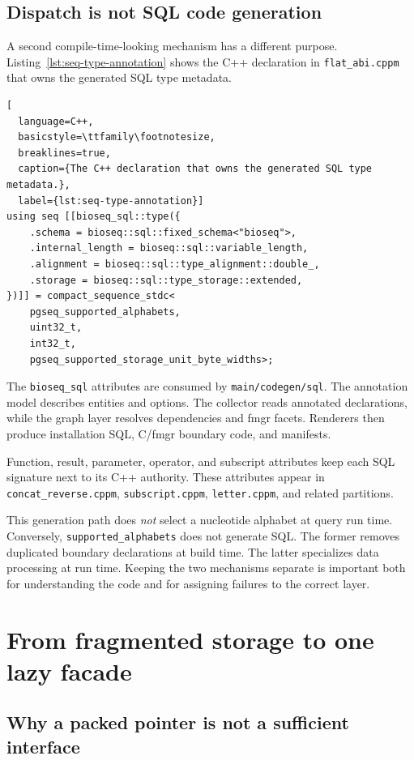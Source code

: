 \subsection{Dispatch is not SQL code generation}

A second compile-time-looking mechanism has a different purpose.
Listing~\ref{lst:seq-type-annotation} shows the C++ declaration in
\texttt{flat\_abi.cppm} that owns the generated SQL type metadata.

\begin{lstlisting}[
  language=C++,
  basicstyle=\ttfamily\footnotesize,
  breaklines=true,
  caption={The C++ declaration that owns the generated SQL type metadata.},
  label={lst:seq-type-annotation}]
using seq [[bioseq_sql::type({
    .schema = bioseq::sql::fixed_schema<"bioseq">,
    .internal_length = bioseq::sql::variable_length,
    .alignment = bioseq::sql::type_alignment::double_,
    .storage = bioseq::sql::type_storage::extended,
})]] = compact_sequence_stdc<
    pgseq_supported_alphabets,
    uint32_t,
    int32_t,
    pgseq_supported_storage_unit_byte_widths>;
\end{lstlisting}

The \texttt{bioseq\_sql} attributes are consumed by
\texttt{main/codegen/sql}.  The annotation model describes entities and
options.  The collector reads annotated declarations, while the graph layer
resolves dependencies and fmgr facets.  Renderers then produce installation
SQL, C/fmgr boundary code, and manifests.

Function, result, parameter, operator, and subscript attributes keep each SQL
signature next to its C++ authority.  These attributes appear in
\texttt{concat\_reverse.cppm}, \texttt{subscript.cppm},
\texttt{letter.cppm}, and related partitions.

This generation path does \emph{not} select a nucleotide alphabet at query
run time.  Conversely, \texttt{supported\_alphabets} does not generate SQL.
The former removes duplicated boundary declarations at build time.  The latter
specializes data processing at run time.  Keeping the two mechanisms separate
is important both for understanding the code and for assigning failures to
the correct layer.

\section{From fragmented storage to one lazy facade}
\label{sec:lazy-sequence-facade}

\subsection{Why a packed pointer is not a sufficient interface}

